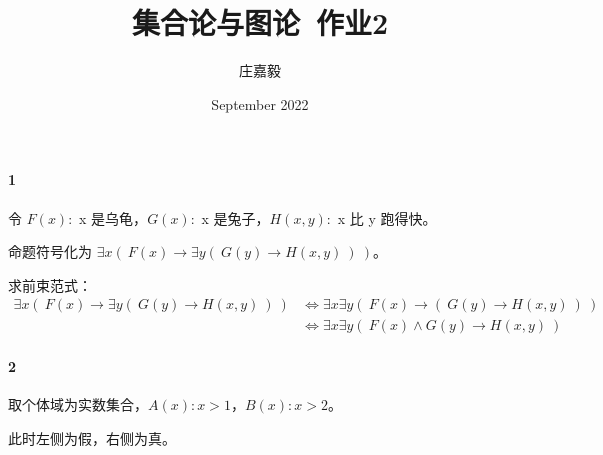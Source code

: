 \documentclass{ctexart}
\title{集合论与图论~作业2}
\author{庄嘉毅}
\date{September 2022}
\begin{document}
\maketitle

\paragraph*{1} 令 $F(x):$ x 是乌龟，$G(x):$ x 是兔子，$H(x,y):$ x 比 y 跑得快。

命题符号化为 $\exists x (\ F(x)\rightarrow \exists y(\ G(y)\rightarrow H(x,y)\ )\ )$。

求前束范式：
\begin{align*}
\exists x (\ F(x)\rightarrow \exists y(\ G(y)\rightarrow H(x,y)\ )\ ) &\Leftrightarrow \exists x \exists y (\ F(x)\rightarrow (\ G(y)\rightarrow H(x,y)\ )\ ) \\
&\Leftrightarrow \exists x \exists y (\ F(x)\wedge G(y) \rightarrow H(x,y)\ )
\end{align*}

\paragraph*{2} 取个体域为实数集合，$A(x): x>1$，$B(x):x>2$。

此时左侧为假，右侧为真。
\end{document}
